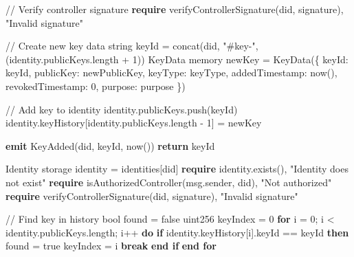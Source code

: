 \documentclass[lettersize,journal]{IEEEtran}
\begin{document}
\begin{itemize}
\begin{algorithm}[H]
\begin{algorithmic}[1]
    \State // Verify controller signature
    \State \textbf{require} verifyControllerSignature(did, signature), "Invalid signature"
    
    \State // Create new key data
    \State string keyId = concat(did, "#key-", (identity.publicKeys.length + 1))
    \State KeyData memory newKey = KeyData(\{
        \hspace{\algorithmicindent}keyId: keyId,
        \hspace{\algorithmicindent}publicKey: newPublicKey,
        \hspace{\algorithmicindent}keyType: keyType,
        \hspace{\algorithmicindent}addedTimestamp: now(),
        \hspace{\algorithmicindent}revokedTimestamp: 0,
        \hspace{\algorithmicindent}purpose: purpose
    \})
    
    \State // Add key to identity
    \State identity.publicKeys.push(keyId)
    \State identity.keyHistory[identity.publicKeys.length - 1] = newKey
    
    \State \textbf{emit} KeyAdded(did, keyId, now())
    \State \textbf{return} keyId
\EndFunction
\Statex 

    \State Identity storage identity = identities[did]
    \State \textbf{require} identity.exists(), "Identity does not exist"
    \State \textbf{require} isAuthorizedController(msg.sender, did), "Not authorized"
    \State \textbf{require} verifyControllerSignature(did, signature), "Invalid signature"
    
    \State // Find key in history
    \State bool found = false
    \State uint256 keyIndex = 0
    \State \textbf{for} i = 0; i < identity.publicKeys.length; i++ \textbf{do}
        \State \hspace{\algorithmicindent} \textbf{if} identity.keyHistory[i].keyId == keyId \textbf{then}
            \State \hspace{\algorithmicindent}\hspace{\algorithmicindent} found = true
            \State \hspace{\algorithmicindent}\hspace{\algorithmicindent} keyIndex = i
            \State \hspace{\algorithmicindent}\hspace{\algorithmicindent} \textbf{break}
        \State \hspace{\algorithmicindent} \textbf{end if}
    \State \textbf{end for}
    

\end{algorithmic}
\end{algorithm}
\end{itemize}
\end{document}
